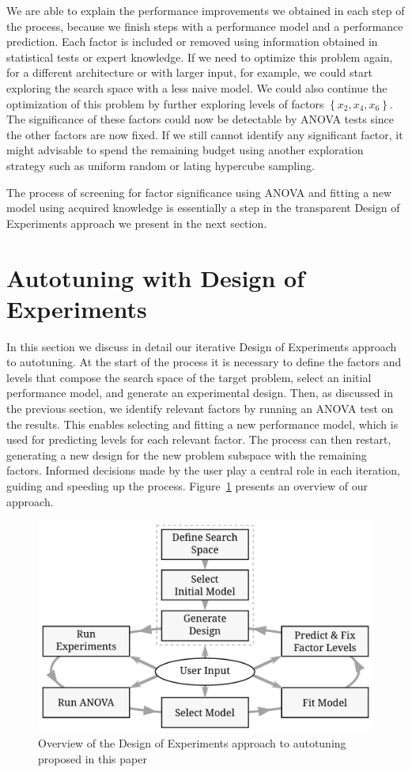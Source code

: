 \documentclass[conference]{IEEEtran}
\begin{document}
We are able to explain the performance improvements we obtained in each step of
the process, because we finish steps with a performance model and a performance
prediction. Each factor is included or removed using information obtained in
statistical tests or expert knowledge. If we need to optimize this problem
again, for a different architecture or with larger input, for example, we could
start exploring the search space with a less naive model. We could also continue
the optimization of this problem by further exploring levels of factors
\(\left\{x_2,x_4,x_6\right\}\). The significance of these factors could now be
detectable by ANOVA tests since the other factors are now fixed. If we still
cannot identify any significant factor, it might advisable to spend the
remaining budget using another exploration strategy such as uniform random or
lating hypercube sampling.

The process of screening for factor significance using ANOVA and fitting a
new model using acquired knowledge is essentially a step in the transparent
Design of Experiments approach we present in the next section.
\section{Autotuning with Design of Experiments}
\label{sec:org2c2f2a9}
In this section we discuss in detail our iterative Design of Experiments
approach to autotuning. At the start of the process it is necessary to define
the factors and levels that compose the search space of the target problem,
select an initial performance model, and generate an experimental design. Then,
as discussed in the previous section, we identify relevant factors by running an
ANOVA test on the results. This enables selecting and fitting a new performance
model, which is used for predicting levels for each relevant factor. The process
can then restart, generating a new design for the new problem subspace with the
remaining factors. Informed decisions made by the user play a central role in
each iteration, guiding and speeding up the process.
Figure~\ref{fig:org7c55384} presents an overview of our approach.

\begin{figure}[b]\vspace{-.5cm}
\centering
\includegraphics[width=.95\columnwidth]{./img/doe_anova_strategy.pdf}
\caption{\label{fig:org7c55384}
Overview of the Design of Experiments approach to autotuning proposed in this paper}
\end{figure}
\end{document}
